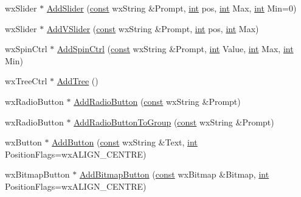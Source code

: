 \begin{DoxyCompactItemize}
\item 
wx\+Slider $\ast$ \hyperlink{class_shuttle_gui_base_ab5483f256392246255a5b5f6c4638c5e}{Add\+Slider} (\hyperlink{getopt1_8c_a2c212835823e3c54a8ab6d95c652660e}{const} wx\+String \&Prompt, \hyperlink{xmltok_8h_a5a0d4a5641ce434f1d23533f2b2e6653}{int} pos, \hyperlink{xmltok_8h_a5a0d4a5641ce434f1d23533f2b2e6653}{int} Max, \hyperlink{xmltok_8h_a5a0d4a5641ce434f1d23533f2b2e6653}{int} Min=0)
\item 
wx\+Slider $\ast$ \hyperlink{class_shuttle_gui_base_a0bf1e5bd61cdebda10386559dcd11c0e}{Add\+V\+Slider} (\hyperlink{getopt1_8c_a2c212835823e3c54a8ab6d95c652660e}{const} wx\+String \&Prompt, \hyperlink{xmltok_8h_a5a0d4a5641ce434f1d23533f2b2e6653}{int} pos, \hyperlink{xmltok_8h_a5a0d4a5641ce434f1d23533f2b2e6653}{int} Max)
\item 
wx\+Spin\+Ctrl $\ast$ \hyperlink{class_shuttle_gui_base_a5f9ca61cc51128580b6d3d19e23f6b0f}{Add\+Spin\+Ctrl} (\hyperlink{getopt1_8c_a2c212835823e3c54a8ab6d95c652660e}{const} wx\+String \&Prompt, \hyperlink{xmltok_8h_a5a0d4a5641ce434f1d23533f2b2e6653}{int} Value, \hyperlink{xmltok_8h_a5a0d4a5641ce434f1d23533f2b2e6653}{int} Max, \hyperlink{xmltok_8h_a5a0d4a5641ce434f1d23533f2b2e6653}{int} Min)
\item 
wx\+Tree\+Ctrl $\ast$ \hyperlink{class_shuttle_gui_base_a8fc66c8136893eb772a389700fc71daf}{Add\+Tree} ()
\item 
wx\+Radio\+Button $\ast$ \hyperlink{class_shuttle_gui_base_a7f7670bb731cda2f9c1da83640ba2e2d}{Add\+Radio\+Button} (\hyperlink{getopt1_8c_a2c212835823e3c54a8ab6d95c652660e}{const} wx\+String \&Prompt)
\item 
wx\+Radio\+Button $\ast$ \hyperlink{class_shuttle_gui_base_a061bfd950a17f1da00c06bc353e04f44}{Add\+Radio\+Button\+To\+Group} (\hyperlink{getopt1_8c_a2c212835823e3c54a8ab6d95c652660e}{const} wx\+String \&Prompt)
\item 
wx\+Button $\ast$ \hyperlink{class_shuttle_gui_base_a88b56806bad47b9301a6efad9b7c9eff}{Add\+Button} (\hyperlink{getopt1_8c_a2c212835823e3c54a8ab6d95c652660e}{const} wx\+String \&Text, \hyperlink{xmltok_8h_a5a0d4a5641ce434f1d23533f2b2e6653}{int} Position\+Flags=wx\+A\+L\+I\+G\+N\+\_\+\+C\+E\+N\+T\+RE)
\item 
wx\+Bitmap\+Button $\ast$ \hyperlink{class_shuttle_gui_base_aff5988b14c64180c0500c3064f89a265}{Add\+Bitmap\+Button} (\hyperlink{getopt1_8c_a2c212835823e3c54a8ab6d95c652660e}{const} wx\+Bitmap \&Bitmap, \hyperlink{xmltok_8h_a5a0d4a5641ce434f1d23533f2b2e6653}{int} Position\+Flags=wx\+A\+L\+I\+G\+N\+\_\+\+C\+E\+N\+T\+RE)

\end{DoxyCompactItemize}
